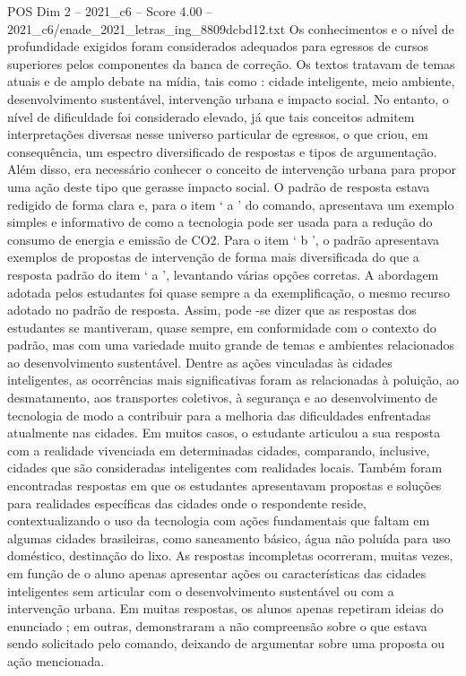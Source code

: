 \begin{textsample}{POS Dim 2 – 2021\_c6 – Score 4.00 – 2021\_c6/enade\_2021\_letras\_ing\_8809dcbd12.txt}
Os conhecimentos e o nível de profundidade exigidos foram considerados adequados para egressos de cursos superiores pelos componentes da banca de correção.
Os textos tratavam de temas atuais e de amplo debate na mídia, tais como : cidade inteligente, meio ambiente, desenvolvimento sustentável, intervenção urbana e impacto social.
No entanto, o nível de dificuldade foi considerado elevado, já que tais conceitos admitem interpretações diversas nesse universo particular de egressos, o que criou, em consequência, um espectro diversificado de respostas e tipos de argumentação.
Além disso, era necessário conhecer o conceito de intervenção urbana para propor uma ação deste tipo que gerasse impacto social.
O padrão de resposta estava redigido de forma clara e, para o item ‘ a ’ do comando, apresentava um exemplo simples e informativo de como a tecnologia pode ser usada para a redução do consumo de energia e emissão de CO2.
Para o item ‘ b ’, o padrão apresentava exemplos de propostas de intervenção de forma mais diversificada do que a resposta padrão do item ‘ a ’, levantando várias opções corretas.
A abordagem adotada pelos estudantes foi quase sempre a da exemplificação, o mesmo recurso adotado no padrão de resposta.
Assim, pode -se dizer que as respostas dos estudantes se mantiveram, quase sempre, em conformidade com o contexto do padrão, mas com uma variedade muito grande de temas e ambientes relacionados ao desenvolvimento sustentável.
Dentre as ações vinculadas às cidades inteligentes, as ocorrências mais significativas foram as relacionadas à poluição, ao desmatamento, aos transportes coletivos, à segurança e ao desenvolvimento de tecnologia de modo a contribuir para a melhoria das dificuldades enfrentadas atualmente nas cidades.
Em muitos casos, o estudante articulou a sua resposta com a realidade vivenciada em determinadas cidades, comparando, inclusive, cidades que são consideradas inteligentes com realidades locais.
Também foram encontradas respostas em que os estudantes apresentavam propostas e soluções para realidades específicas das cidades onde o respondente reside, contextualizando o uso da tecnologia com ações fundamentais que faltam em algumas cidades brasileiras, como saneamento básico, água não poluída para uso doméstico, destinação do lixo.
As respostas incompletas ocorreram, muitas vezes, em função de o aluno apenas apresentar ações ou características das cidades inteligentes sem articular com o desenvolvimento sustentável ou com a intervenção urbana.
Em muitas respostas, os alunos apenas repetiram ideias do enunciado ; em outras, demonstraram a não compreensão sobre o que estava sendo solicitado pelo comando, deixando de argumentar sobre uma proposta ou ação mencionada.

\end{textsample}
